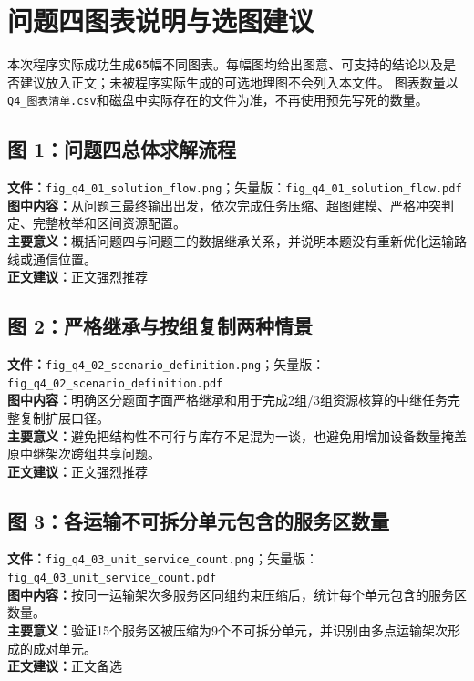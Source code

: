 \section*{问题四图表说明与选图建议}
本次程序实际成功生成\textbf{65}幅不同图表。每幅图均给出图意、可支持的结论以及是否建议放入正文；未被程序实际生成的可选地理图不会列入本文件。
图表数量以\texttt{Q4\_图表清单.csv}和磁盘中实际存在的文件为准，不再使用预先写死的数量。

\subsection*{图 1：问题四总体求解流程}
\textbf{文件：}\texttt{fig\_q4\_01\_solution\_flow.png}；矢量版：\texttt{fig\_q4\_01\_solution\_flow.pdf}\\
\textbf{图中内容：}从问题三最终输出出发，依次完成任务压缩、超图建模、严格冲突判定、完整枚举和区间资源配置。\\
\textbf{主要意义：}概括问题四与问题三的数据继承关系，并说明本题没有重新优化运输路线或通信位置。\\
\textbf{正文建议：}正文强烈推荐

\subsection*{图 2：严格继承与按组复制两种情景}
\textbf{文件：}\texttt{fig\_q4\_02\_scenario\_definition.png}；矢量版：\texttt{fig\_q4\_02\_scenario\_definition.pdf}\\
\textbf{图中内容：}明确区分题面字面严格继承和用于完成2组/3组资源核算的中继任务完整复制扩展口径。\\
\textbf{主要意义：}避免把结构性不可行与库存不足混为一谈，也避免用增加设备数量掩盖原中继架次跨组共享问题。\\
\textbf{正文建议：}正文强烈推荐

\subsection*{图 3：各运输不可拆分单元包含的服务区数量}
\textbf{文件：}\texttt{fig\_q4\_03\_unit\_service\_count.png}；矢量版：\texttt{fig\_q4\_03\_unit\_service\_count.pdf}\\
\textbf{图中内容：}按同一运输架次多服务区同组约束压缩后，统计每个单元包含的服务区数量。\\
\textbf{主要意义：}验证15个服务区被压缩为9个不可拆分单元，并识别由多点运输架次形成的成对单元。\\
\textbf{正文建议：}正文备选

